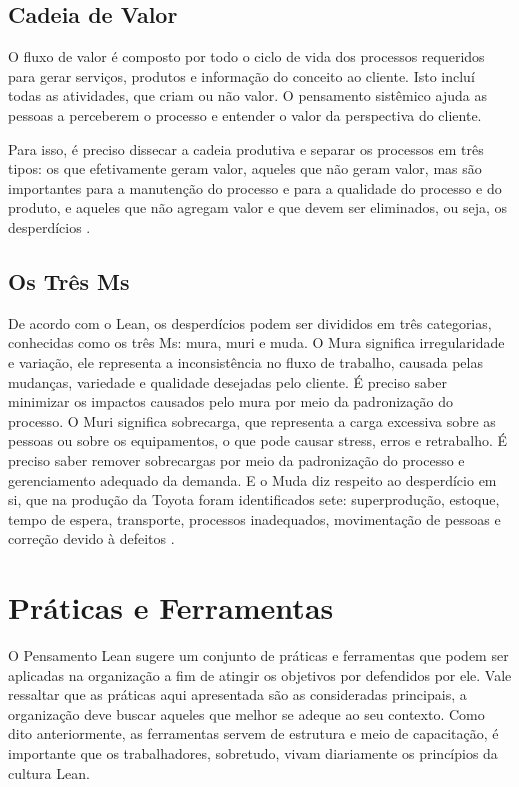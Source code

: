 \begin{anexosenv}
\subsection[Cadeia de Valor]{Cadeia de Valor}

O fluxo de valor é composto por todo o ciclo de vida dos processos requeridos para gerar serviços, produtos e informação do conceito ao cliente.  Isto incluí todas as atividades, que criam ou não valor. O pensamento sistêmico ajuda as pessoas a perceberem o processo e entender o valor da perspectiva do cliente. 

Para isso, é preciso dissecar a cadeia produtiva e separar os processos em três tipos: os que efetivamente geram valor, aqueles que não geram valor, mas são importantes para a manutenção do processo e para a qualidade do processo e do produto, e aqueles que não agregam valor e que devem ser eliminados, ou seja, os desperdícios \cite{leaninstitute}.

\subsection[Os Três Ms]{Os Três Ms}

De acordo com o Lean, os desperdícios podem ser divididos em três categorias, conhecidas como os três Ms: mura, muri e muda. O Mura significa irregularidade e variação, ele representa a inconsistência no fluxo de trabalho, causada pelas mudanças, variedade e qualidade desejadas pelo cliente. É preciso saber minimizar os impactos causados pelo mura por meio da padronização do processo. O Muri significa sobrecarga, que representa a carga excessiva sobre as pessoas ou sobre os equipamentos, o que pode causar stress, erros e retrabalho. É preciso saber remover sobrecargas por meio da padronização do processo e gerenciamento adequado da demanda. E o Muda diz respeito ao desperdício em si, que na produção da Toyota foram identificados sete: superprodução, estoque, tempo de espera, transporte, processos inadequados, movimentação de pessoas e correção devido à defeitos  \cite{bell2011}.

\section[Práticas e Ferramentas]{Práticas e Ferramentas}

O Pensamento Lean sugere um conjunto de práticas e ferramentas que podem ser aplicadas na organização a fim de atingir os objetivos por defendidos por ele. Vale ressaltar que as práticas aqui apresentada são as consideradas principais, a organização deve buscar aqueles que melhor se adeque ao seu contexto. Como dito anteriormente, as ferramentas servem de estrutura e meio de capacitação, é importante que os trabalhadores, sobretudo, vivam diariamente os princípios da cultura Lean.


\end{anexosenv}
